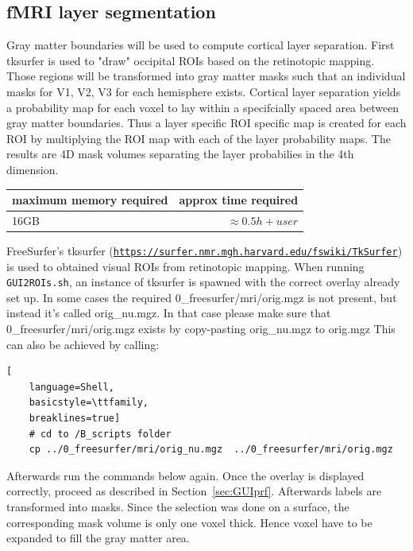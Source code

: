 \documentclass[12pt,a4paper]{scrartcl}
\begin{document}
\subsection{fMRI layer segmentation}
Gray matter boundaries will be used to compute cortical layer separation. First tksurfer is used to "draw" occipital ROIs based on the retinotopic mapping. Those regions will be transformed into gray matter masks such that an individual masks for V1, V2, V3 for each hemisphere exists. Cortical layer separation yields a probability map for each voxel to lay within a specifcially spaced area between gray matter boundaries. Thus a layer specific ROI specific map is created for each ROI by multiplying the ROI map with each of the layer probability maps. The results are 4D mask volumes separating the layer probabilies in the 4th dimension.
\begin{table}[h]
\begin{tabular}{l | r}
\toprule
maximum memory required & approx time required\\\toprule
16GB & $\approx 0.5h+user$ \\\bottomrule
\end{tabular}
\end{table}
\FloatBarrier
FreeSurfer's tksurfer (\href{https://surfer.nmr.mgh.harvard.edu/fswiki/TkSurfer}{\nolinkurl{https://surfer.nmr.mgh.harvard.edu/fswiki/TkSurfer}}) is used to obtained visual ROIs from retinotopic mapping. When running \texttt{GUI2ROIs.sh}, an instance of tksurfer is spawned with the correct overlay already set up. In some cases the required 0\_freesurfer/mri/orig.mgz is not present, but instead it's called orig\_nu.mgz. In that case please make sure that 0\_freesurfer/mri/orig.mgz exists by copy-pasting orig\_nu.mgz to orig.mgz This can also be achieved by calling:\\
\begin{lstlisting}[
    language=Shell,
    basicstyle=\ttfamily,
    breaklines=true]
    # cd to /B_scripts folder
    cp ../0_freesurfer/mri/orig_nu.mgz  ../0_freesurfer/mri/orig.mgz
\end{lstlisting}
Afterwards run the commands below again. Once the overlay is displayed correctly, proceed as described in Section~\ref{sec:GUIprf}. Afterwards labels are transformed into masks. Since the selection was done on a surface, the corresponding mask volume is only one voxel thick. Hence voxel have to be expanded to fill the gray matter area.\\
\end{document}
